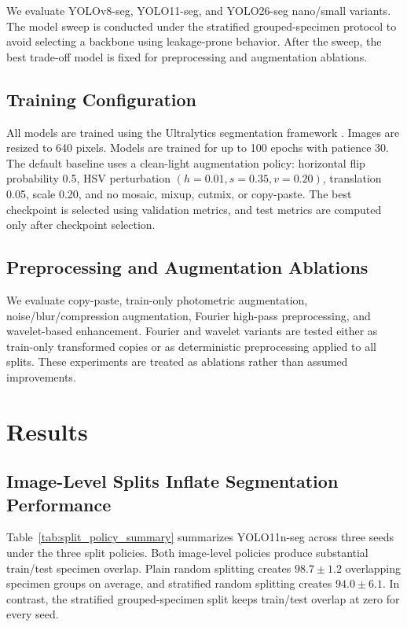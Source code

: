 \documentclass{svproc}
\begin{document}
We evaluate YOLOv8-seg, YOLO11-seg, and YOLO26-seg nano/small variants. The model sweep is conducted under the stratified grouped-specimen protocol to avoid selecting a backbone using leakage-prone behavior. After the sweep, the best trade-off model is fixed for preprocessing and augmentation ablations.

\subsection{Training Configuration}

All models are trained using the Ultralytics segmentation framework \cite{ultralytics2026}. Images are resized to 640 pixels. Models are trained for up to 100 epochs with patience 30. The default baseline uses a clean-light augmentation policy: horizontal flip probability 0.5, HSV perturbation $(h=0.01,s=0.35,v=0.20)$, translation 0.05, scale 0.20, and no mosaic, mixup, cutmix, or copy-paste. The best checkpoint is selected using validation metrics, and test metrics are computed only after checkpoint selection.

\subsection{Preprocessing and Augmentation Ablations}

We evaluate copy-paste, train-only photometric augmentation, noise/blur/compression augmentation, Fourier high-pass preprocessing, and wavelet-based enhancement. Fourier and wavelet variants are tested either as train-only transformed copies or as deterministic preprocessing applied to all splits. These experiments are treated as ablations rather than assumed improvements.

\section{Results}

\subsection{Image-Level Splits Inflate Segmentation Performance}

Table~\ref{tab:split_policy_summary} summarizes YOLO11n-seg across three seeds under the three split policies. Both image-level policies produce substantial train/test specimen overlap. Plain random splitting creates $98.7 \pm 1.2$ overlapping specimen groups on average, and stratified random splitting creates $94.0 \pm 6.1$. In contrast, the stratified grouped-specimen split keeps train/test overlap at zero for every seed.
\end{document}
